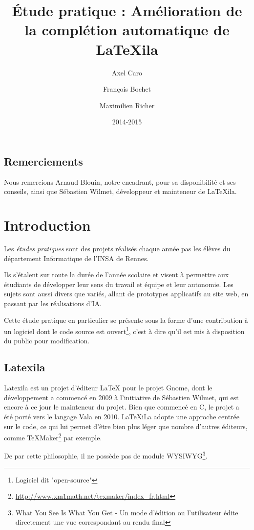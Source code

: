 \documentclass[a4paper,11pt]{report}
\title{Étude pratique : Amélioration de la complétion automatique de \LaTeX{}ila}
\author{Axel Caro\and François Bochet\and Maximilien Richer}
\date{2014-2015}
\begin{document}


\maketitle %
\tableofcontents %

\section{Remerciements} %
\label{sec:remerciements}
Nous remercions Arnaud Blouin, notre encadrant, pour sa disponibilité et ses conseils, ainsi que Sébastien Wilmet, développeur et mainteneur de LaTeXila.

\chapter{Introduction}
\label{cha:Introduction}
Les \textit{études pratiques} sont des projets réalisés chaque année pas les élèves du département Informatique de l'INSA de Rennes.

Ils s'étalent sur toute la durée de l'année scolaire et visent à permettre aux étudiants de développer leur sens du travail et équipe et leur autonomie.
Les sujets sont aussi divers que variés, allant de prototypes applicatifs au site web, en passant par les réalisations d'IA.

Cette étude pratique en particulier se présente sous la forme d'une contribution à un logiciel dont le code source est ouvert\footnote{Logiciel dit "open-source"}, c'est à dire qu'il est mis à disposition du public pour modification.

\section{Latexila}
\label{sec:latexila}
Latexila est un projet d'éditeur LaTeX pour le projet Gnome, dont le développement a commencé en 2009 à l'initiative de Sébastien Wilmet, qui est encore à ce jour le mainteneur du projet.
Bien que commencé en C, le projet a été porté vers le langage Vala en 2010. LaTeXiLa adopte une approche centrée sur le code, ce qui lui permet d'être bien plus léger que nombre d'autres éditeurs, comme TeXMaker\footnote{\url{http://www.xm1math.net/texmaker/index_fr.html}} par exemple.

De par cette philosophie, il ne possède pas de module WYSIWYG\footnote{What You See Is What You Get - Un mode d'édition ou l'utilisateur édite directement une vue correspondant au rendu final}.
\end{document}
